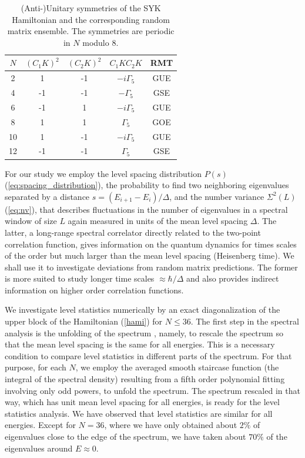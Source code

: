 \documentclass[aps,showpacs,floatfix,superscriptaddress,pre,11pt]{revtex4-1}
\begin{document}
     \begin{table}[t!]
   \begin{tabular}{c|c|c|c|c}
       $N$   &$ (C_1 K)^2$ & $(C_2K)^2$ &$C_1KC_2K$ &   RMT\\
       \hline
       2  &     1   &       -1    & $-i\Gamma_5$  & GUE \\
       4  &    -1   &       -1    & $-\Gamma_5 $   & GSE \\
       6  &    -1   &        1    & $-i\Gamma_5$   & GUE \\
       8  &     1   &        1    & $\Gamma_5  $   & GOE \\
       10 &     1   &       -1    & $-i\Gamma_5$   & GUE \\
       12 &    -1   &       -1    & $\Gamma_5$     & GSE \\
        \end{tabular}
   \caption{(Anti-)Unitary symmetries of the SYK Hamiltonian and the corresponding random matrix ensemble.
     The symmetries are periodic in $N$ modulo 8.}
     \end{table}
 For our study we employ the level spacing distribution $P(s)$ (\ref{eq:spacing_distribution}), the probability to find two neighboring eigenvalues separated by a distance $s=(E_{i+1}-E_i)/\Delta$, and the number variance $\Sigma^2(L)$ (\ref{eq:nv}), that describes fluctuations in the number of eigenvalues in a spectral window of size $L$ again measured in units of the mean level spacing $\Delta$. The latter, a long-range spectral correlator directly related to the two-point correlation function, gives information on the quantum dynamics for times scales of the order but much larger than the mean level spacing (Heisenberg time). We shall use it to investigate deviations from random matrix predictions. The former is more suited to study longer time scales $\approx \hbar /\Delta$ and also provides indirect information on higher order correlation functions. 
 
 We investigate level statistics numerically by an exact diagonalization of the upper block of
 the Hamiltonian (\ref{hami}) for $N \leq 36$. 
 The first step in the spectral analysis is the unfolding of the spectrum \cite{guhr1998}, namely, to rescale the spectrum so that the mean level spacing is the same for all energies. This is a necessary condition to compare level statistics in different parts of the spectrum. For that purpose, for each $N$, we employ the averaged smooth staircase function (the integral of the spectral density) 
 resulting from a fifth order polynomial fitting involving only odd powers, to unfold the spectrum.
 The spectrum rescaled in that way, which has unit mean level spacing for all energies, is ready for the level statistics analysis. We have observed that level statistics are similar for all energies. Except for $N = 36$, where we have only obtained about $2\%$ of eigenvalues close to the edge of the spectrum, we have taken about $70\%$ of the eigenvalues around $E \approx 0$.  
\end{document}
